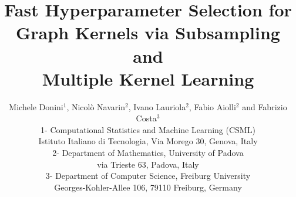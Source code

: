 \documentclass{esannV2}
\newcommand{\1}{{\bf 1}}
\begin{document}
\title{Fast Hyperparameter Selection for Graph Kernels via Subsampling and\\Multiple Kernel Learning}

\author{Michele Donini$^1$, Nicol\`o Navarin$^2$, Ivano Lauriola$^2$, Fabio Aiolli$^2$ and Fabrizio Costa$^3$
%
%
\vspace{.3cm}\\
%
1- Computational Statistics and Machine Learning (CSML) \\
Istituto Italiano di Tecnologia, Via Morego 30, Genova, Italy
\vspace{.1cm}\\
2- Department of Mathematics, University of Padova\\
via Trieste 63, Padova, Italy
\vspace{.1cm}\\
3- Department of Computer Science, Freiburg University \\
Georges-Kohler-Allee 106, 79110 Freiburg, Germany\\
}

%

\maketitle
\end{document}
